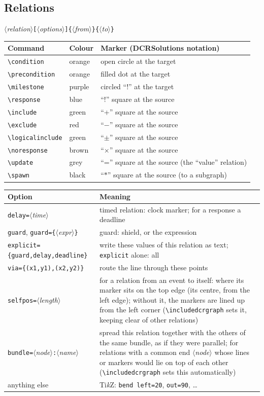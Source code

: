\documentclass[a4paper,11pt]{article}
\newcommand\cs[1]{\texttt{\textbackslash#1}}
\newcommand\key[1]{\texttt{#1}}
\newcommand\meta[1]{\ensuremath{\langle}\textit{#1}\ensuremath{\rangle}}
\newcommand\marg[1]{\texttt{\{}\meta{#1}\texttt{\}}}
\newcommand\oarg[1]{\texttt{[}\meta{#1}\texttt{]}}
\begin{document}
\subsection{Relations}
\meta{relation}\oarg{options}\marg{from}\marg{to}

\medskip
\begin{tabularx}{\linewidth}{@{}llL@{}}
\toprule
Command & Colour & Marker (DCRSolutions notation)\\
\midrule
\cs{condition} & orange & open circle at the target\\
\cs{precondition} & orange & filled dot at the target\\
\cs{milestone} & purple & circled ``!'' at the target\\
\cs{response} & blue & ``!'' square at the source\\
\cs{include} & green & ``+'' square at the source\\
\cs{exclude} & red & ``$-$'' square at the source\\
\cs{logicalinclude} & green & ``$\pm$'' square at the source\\
\cs{noresponse} & brown & ``$\times$'' square at the source\\
\cs{update} & grey & ``='' square at the source (the ``value'' relation)\\
\cs{spawn} & black & ``$\ast$'' square at the source (to a subgraph)\\
\bottomrule
\end{tabularx}

\medskip
\begin{tabularx}{\linewidth}{@{}lL@{}}
\toprule
Option & Meaning\\
\midrule
\key{delay=}\meta{time} & timed relation: clock marker; for a response a deadline\\
\key{guard}, \key{guard=\{}\meta{expr}\key{\}} & guard: shield, or the expression\\
\key{explicit=\{guard,delay,deadline\}} & write these values of this relation as
  text; \key{explicit} alone: all\\
\key{via=\{(x1,y1),(x2,y2)\}} & route the line through these points\\
\key{selfpos=}\meta{length} & for a relation from an event to itself: where its
  marker sits on the top edge (its centre, from the left edge); without it,
  the markers are lined up from the left corner (\cs{includedcrgraph} sets
  it, keeping clear of other relations)\\
\key{bundle=}\meta{node}\key{:}\meta{name} & spread this relation together with
  the others of the same bundle, as if they were parallel; for relations
  with a common end \meta{node} whose lines or markers would lie on top of
  each other (\cs{includedcrgraph} sets this automatically)\\
anything else & Ti\emph{k}Z: \key{bend left=20}, \key{out=90}, \dots\\
\bottomrule
\end{tabularx}
\end{document}
